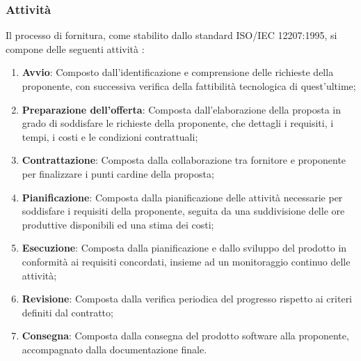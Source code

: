 \documentclass[10pt]{article}
\begin{document}
\begin{justify}
    \subsubsection{Attività}
    Il processo di fornitura, come stabilito dallo standard ISO/IEC 12207:1995, si compone delle seguenti attività :
    \begin{enumerate}
        \item \textbf{Avvio}: Composto dall'identificazione e comprensione delle richieste della proponente, con successiva verifica della fattibilità tecnologica di quest'ultime;
        \item \textbf{Preparazione dell'offerta}: Composta dall'elaborazione della proposta in grado di soddisfare le richieste della proponente, che dettagli i requisiti, i tempi, i costi e le condizioni contrattuali;
        \item \textbf{Contrattazione}: Composta dalla collaborazione tra fornitore e proponente per finalizzare i punti cardine della proposta;
        \item \textbf{Pianificazione}: Composta dalla pianificazione delle attività necessarie per soddisfare i requisiti della proponente, seguita da una suddivisione delle ore produttive disponibili ed una stima dei costi;
        \item \textbf{Esecuzione}: Composta dalla pianificazione e dallo sviluppo del prodotto in conformità ai requisiti concordati, insieme ad un monitoraggio continuo delle attività;
        \item \textbf{Revisione}: Composta dalla verifica periodica del progresso rispetto ai criteri definiti dal contratto;
        \item \textbf{Consegna}: Composta dalla consegna del prodotto software alla proponente, accompagnato dalla documentazione finale.
    \end{enumerate}


\end{justify}
\end{document}
